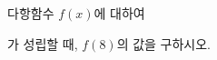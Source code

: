 \hspace*{2mm}\begin{minipage}[t]{\dimexpr\linewidth-2mm\relax}\vspace{0pt}
다항함수 $f(x)$에 대하여 \par\smallskip{}\par\smallskip\noindent 가 성립할 때, $f(8)$의 값을 구하시오. \end{minipage}

